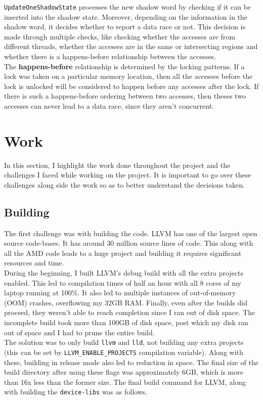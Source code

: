 \documentclass{btp}
\begin{document}
\texttt{UpdateOneShadowState} processes the new shadow word by checking if it can be inserted into the shadow state. Moreover, depending on the information in the shadow word, it decides whether to report a data race or not. This decision is made through multiple checks, like checking whether the accesses are from different threads, whether the accesses are in the same or intersecting regions and whether there is a happens-before relationship between the accesses.
\\
\newline
The \textbf{happens-before} \cite{happens-before} relationship is determined by the locking patterns. If a lock was taken on a particular memory location, then all the accesses before the lock is unlocked will be considered to happen before any accesses after the lock. If there is such a happens-before ordering between two accesses, then theses two accesses can never lead to a data race, since they aren't concurrent.

\section{Work}

In this section, I highlight the work done throughout the project and the challenges I faced while working on the project. It is important to go over these challenges along side the work so as to better understand the decisions taken.

\subsection{Building}

The first challenge was with building the code. LLVM has one of the largest open source code-bases. It has around 30 million source lines of code. This along with all the AMD code leads to a huge project and building it requires significant resources and time.
\\
\newline
During the beginning, I built LLVM's debug build with all the extra projects enabled. This led to compilation times of half an hour with all 8 cores of my laptop running at 100\%. It also led to multiple instances of out-of-memory (OOM) crashes, overflowing my 32GB RAM. Finally, even after the builds did proceed, they weren't able to reach completion since I ran out of disk space. The incomplete build took more than 100GB of disk space, post which my disk ran out of space and I had to prune the entire build.
\\
\newline
The solution was to only build \texttt{llvm} and \texttt{lld}, not building any extra projects (this can be set by \texttt{LLVM\_ENABLE\_PROJECTS} compilation variable). Along with these, building in release mode also led to reduction in space. The final size of the build directory after using these flags was approximately 6GB, which is more than 16x less than the former size. The final build command for LLVM, along with building the \texttt{device-libs} was as follows.
\end{document}
